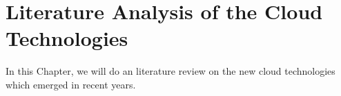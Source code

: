 \chapter{Literature Analysis of the Cloud Technologies}
In this Chapter, we will do an literature review on the new cloud technologies which emerged in recent years. 
